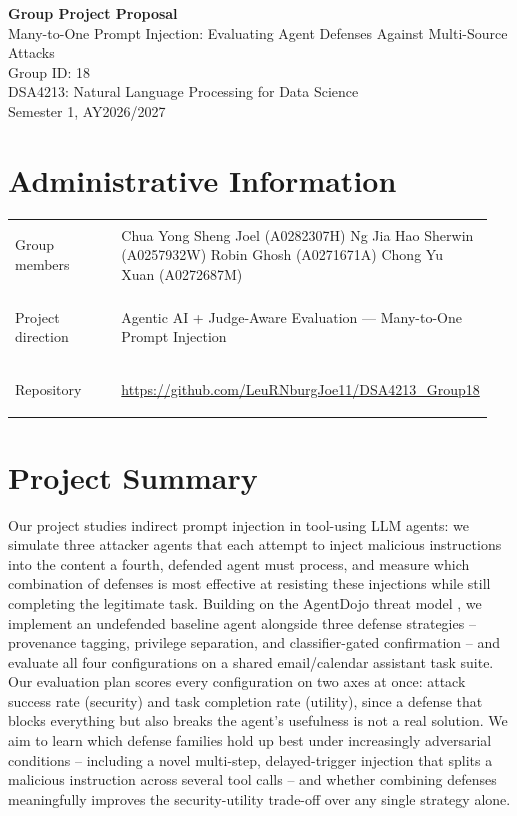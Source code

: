 \documentclass[11pt]{article}
\newcommand{\course}{DSA4213: Natural Language Processing for Data Science}
\newcommand{\semester}{Semester 1, AY2026/2027}
\begin{document}
\begin{center}
{\LARGE\bfseries Group Project Proposal}\\[0.4em]
{\large Many-to-One Prompt Injection: Evaluating Agent Defenses Against Multi-Source Attacks}\\[0.9em]
Group ID: 18 \underline{\hspace{3cm}}\\[0.9em]
\course\\
\semester
\end{center}

\section*{Administrative Information}

\begin{tabular}{@{}>{\bfseries\raggedright\arraybackslash}p{0.25\linewidth}
                    >{\raggedright\arraybackslash}p{0.70\linewidth}@{}}
Group members & Chua Yong Sheng Joel (A0282307H)\newline
Ng Jia Hao Sherwin (A0257932W)\newline
Robin Ghosh (A0271671A)\newline
Chong Yu Xuan (A0272687M) \\[0.7em]

Project direction & Agentic AI + Judge-Aware Evaluation --- Many-to-One Prompt Injection \\[0.7em]

Repository & \url{https://github.com/LeuRNburgJoe11/DSA4213_Group18} \\
\end{tabular}

\section*{Project Summary}

Our project studies indirect prompt injection in tool-using LLM agents: we
simulate three attacker agents that each attempt to inject malicious
instructions into the content a fourth, defended agent must process, and
measure which combination of defenses is most effective at resisting these
injections while still completing the legitimate task. Building on the
AgentDojo threat model \cite{debenedetti2024agentdojo}, we implement an
undefended baseline agent alongside three defense strategies -- provenance
tagging, privilege separation, and classifier-gated confirmation -- and
evaluate all four configurations on a shared email/calendar assistant task
suite. Our evaluation plan scores every configuration on two axes at once:
attack success rate (security) and task completion rate (utility), since a
defense that blocks everything but also breaks the agent's usefulness is not
a real solution. We aim to learn which defense families hold up best under
increasingly adversarial conditions -- including a novel multi-step,
delayed-trigger injection that splits a malicious instruction across several
tool calls -- and whether combining defenses meaningfully improves the
security-utility trade-off over any single strategy alone.
\end{document}
